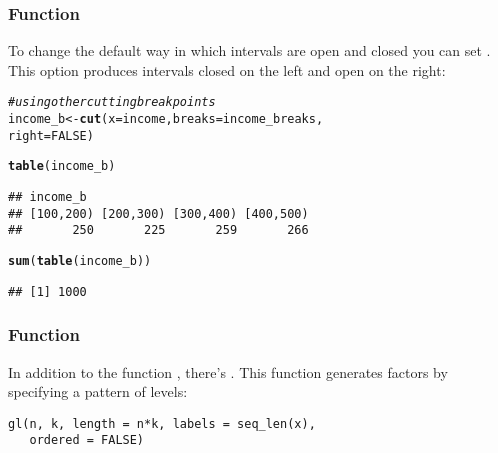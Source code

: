 \documentclass[12pt]{beamer}\usepackage[]{graphicx}\usepackage[]{color}
\makeatletter
\newcommand{\hlnum}[1]{\textcolor[rgb]{0.686,0.059,0.569}{#1}}%
\newcommand{\hlcom}[1]{\textcolor[rgb]{0.678,0.584,0.686}{\textit{#1}}}%
\newcommand{\hlstd}[1]{\textcolor[rgb]{0.345,0.345,0.345}{#1}}%
\newcommand{\hlkwb}[1]{\textcolor[rgb]{0.69,0.353,0.396}{#1}}%
\newcommand{\hlkwc}[1]{\textcolor[rgb]{0.333,0.667,0.333}{#1}}%
\newcommand{\hlkwd}[1]{\textcolor[rgb]{0.737,0.353,0.396}{\textbf{#1}}}%
\newenvironment{kframe}{%
 \def\at@end@of@kframe{}%
 \ifinner\ifhmode%
  \def\at@end@of@kframe{\end{minipage}}%
  \begin{minipage}{\columnwidth}%
 \fi\fi%
 \def\FrameCommand##1{\hskip\@totalleftmargin \hskip-\fboxsep
 \colorbox{shadecolor}{##1}\hskip-\fboxsep
     \hskip-\linewidth \hskip-\@totalleftmargin \hskip\columnwidth}%
 \MakeFramed {\advance\hsize-\width
   \@totalleftmargin\z@ \linewidth\hsize
   \@setminipage}}%
 {\par\unskip\endMakeFramed%
 \at@end@of@kframe}
\newenvironment{knitrout}{}{} %
\makeatother
\begin{document}

\begin{frame}[fragile]
\frametitle{Function }

To change the default way in which intervals are open and closed you can set . This option produces intervals closed on the left and open on the right:
\begin{knitrout}\footnotesize
{}\color{fgcolor}\begin{kframe}
\begin{alltt}
\hlcom{# using other cutting break points}
\hlstd{income_b} \hlkwb{<-} \hlkwd{cut}\hlstd{(}\hlkwc{x} \hlstd{= income,} \hlkwc{breaks} \hlstd{= income_breaks,}
                \hlkwc{right} \hlstd{=} \hlnum{FALSE}\hlstd{)}

\hlkwd{table}\hlstd{(income_b)}
\end{alltt}
\begin{verbatim}
## income_b
## [100,200) [200,300) [300,400) [400,500) 
##       250       225       259       266
\end{verbatim}
\begin{alltt}
\hlkwd{sum}\hlstd{(}\hlkwd{table}\hlstd{(income_b))}
\end{alltt}
\begin{verbatim}
## [1] 1000
\end{verbatim}
\end{kframe}
\end{knitrout}

\end{frame}


\begin{frame}[fragile]
\frametitle{Function }

In addition to the function , there's . This function generates factors by specifying a pattern of levels:

\begin{verbatim}
gl(n, k, length = n*k, labels = seq_len(x), 
   ordered = FALSE)
\end{verbatim}

\end{frame}

\end{document}
